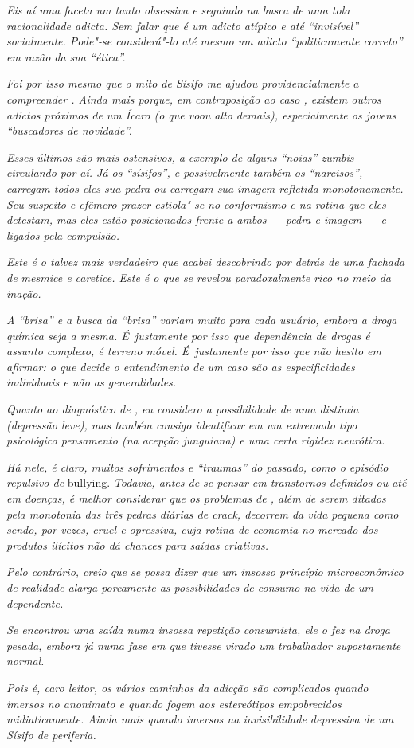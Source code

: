 \emph{Eis aí uma faceta um tanto obsessiva e seguindo na busca de uma
tola racionalidade adicta. Sem falar que  é um adicto atípico e até
``invisível'' socialmente. Pode"-se considerá"-lo até mesmo um adicto
``politicamente correto'' em razão da sua ``ética''.}

\emph{Foi por isso mesmo que o mito de Sísifo me ajudou
providencialmente a compreender . Ainda mais porque, em contraposição
ao caso , existem outros adictos próximos de um Ícaro (o que voou alto
demais), especialmente os jovens ``buscadores de novidade''.}

\emph{Esses últimos são mais ostensivos, a exemplo de alguns ``noias''
zumbis circulando por aí. Já os ``sísifos'', e possivelmente também os
``narcisos'', carregam todos eles sua pedra ou carregam sua imagem
refletida monotonamente. Seu suspeito e efêmero prazer estiola"-se no
conformismo e na rotina que eles detestam, mas eles estão posicionados
frente a ambos --- pedra e imagem --- e ligados pela compulsão.}

\emph{Este é o  talvez mais verdadeiro que acabei descobrindo por
detrás de uma fachada de mesmice e caretice. Este é o  que se revelou
paradoxalmente rico no meio da inação.}

\emph{A ``brisa'' e a busca da ``brisa'' variam muito para cada usuário,
embora a droga química seja a mesma. É~justamente por isso que
dependência de drogas é assunto complexo, é terreno móvel. É~justamente
por isso que não hesito em afirmar: o que decide o entendimento de
um caso são as especificidades individuais e não as generalidades.}

\emph{Quanto ao diagnóstico de , eu considero a possibilidade de uma
distimia (depressão leve), mas também consigo identificar em  um
extremado tipo psicológico pensamento (na acepção junguiana) e uma certa
rigidez neurótica.}

\emph{Há nele, é claro, muitos sofrimentos e ``traumas'' do passado,
como o episódio repulsivo de} bullying. \emph{Todavia, antes de se pensar em
transtornos definidos ou até em doenças, é melhor considerar que os
problemas de , além de serem ditados pela monotonia das três pedras
diárias de crack, decorrem da vida pequena como sendo, por vezes, cruel
e opressiva, cuja rotina de economia no mercado dos produtos ilícitos
não dá chances para saídas criativas.}

\emph{Pelo contrário, creio que se possa dizer que um insosso princípio
microeconômico de realidade alarga porcamente as possibilidades de
consumo na vida de um dependente.}

\emph{Se  encontrou uma saída numa insossa repetição consumista, ele o
fez na droga pesada, embora já numa fase em que tivesse virado um
trabalhador supostamente normal.}

\emph{Pois é, caro leitor, os vários caminhos da adicção são complicados
quando imersos no anonimato e quando fogem aos estereótipos empobrecidos
midiaticamente. Ainda mais quando imersos na invisibilidade depressiva
de um Sísifo de periferia.}
\endgroup